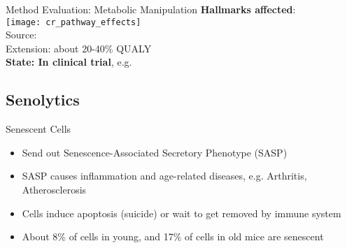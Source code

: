 % 
% 


\begin{frame}[c]{Method Evaluation: Metabolic Manipulation}
    \textbf{Hallmarks affected}: \\
    \texttt{[image: cr\_pathway\_effects]} \\
    Source: \cite{erbaba2020effects} \\
    \pause
    Extension: about 20-40\% QUALY \cite{swindell2012dietary} \\
    \pause
    \textbf{State: In clinical trial}, e.g. \cite{TAMETarg47:online}
\end{frame}


\subsection{Senolytics}

\begin{frame}[c]{Senescent Cells}
    \large

    \begin{itemize}[<+(1)->]
        \item Send out Senescence-Associated Secretory Phenotype (SASP)
        \item SASP causes inflammation and age-related diseases, e.g. Arthritis, Atherosclerosis
        \item Cells induce apoptosis (suicide) or wait to get removed by immune system
        \item About 8\% of cells in young, and 17\% of cells in old mice are senescent \cite{folgueras2018mouse}
    \end{itemize}
\end{frame}

